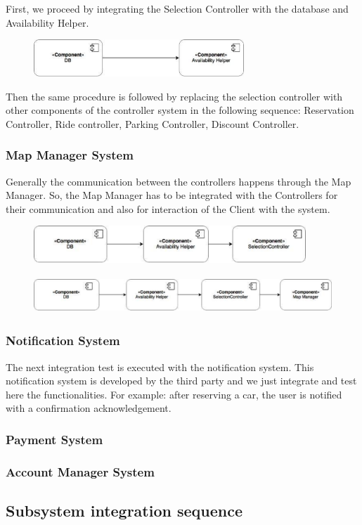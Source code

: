 First, we proceed by integrating the Selection Controller with the database and Availability Helper.

\begin{figure}[h]
	\centering
	\includegraphics[height=1.4cm,keepaspectratio]{figures/itp1.eps}
	\label{fig:itp1}
\end{figure}

Then the same procedure is followed by replacing the selection controller with other components of the controller system in the following sequence: Reservation Controller, Ride controller, Parking Controller, Discount Controller.

\subsubsection*{Map Manager System}
Generally the communication between the controllers happens through the Map Manager. So, the Map Manager has to be integrated with the Controllers for their communication and also for interaction of the Client with the system.

\begin{figure}[h]
	\centering
	\includegraphics[height=1.4cm,keepaspectratio]{figures/itp2.eps}
	\label{fig:itp2}
\end{figure}

\begin{figure}[h]
	\centering
	\includegraphics[height=1.4cm,keepaspectratio]{figures/itp3.eps}
	\label{fig:itp3}
\end{figure}

\subsubsection*{Notification System}
The next integration test is executed with the notification system. This notification system is developed by the third party and we just integrate and test here the functionalities. For example: after reserving a car, the user is notified with a confirmation acknowledgement.

\subsubsection*{Payment System}
\subsubsection*{Account Manager System}

\subsection{Subsystem integration sequence}